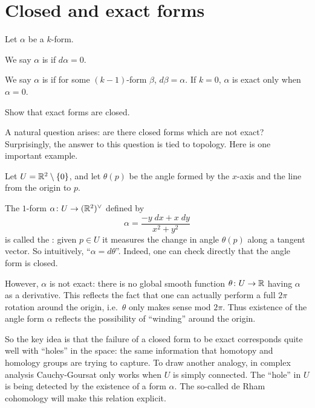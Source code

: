 \section{Closed and exact forms}
Let $\alpha$ be a $k$-form.
\begin{definition}
	We say $\alpha$ is  if $d\alpha = 0$.
\end{definition}
\begin{definition}
	We say $\alpha$ is  if for some $(k-1)$-form $\beta$,
	$d\beta = \alpha$.  If $k = 0$, $\alpha$ is exact only when $\alpha = 0$.
\end{definition}
\begin{ques}
	Show that exact forms are closed.
\end{ques}

A natural question arises: are there closed forms
which are not exact?
Surprisingly, the answer to this question is tied to topology.
Here is one important example.

\begin{example}
	\label{ex:angle_form}
	Let $U = \mathbb R^2 \setminus \{0\}$,
	and let $\theta(p)$ be the angle formed by the $x$-axis
	and the line from the origin to $p$.

	The $1$-form $\alpha \colon U \to (\mathbb R^2)^\vee$ defined by
	\[ \alpha = \frac{-y \; dx + x \; dy}{x^2+y^2} \]
	is called the :
	given $p \in U$ it measures the change in angle $\theta(p)$
	along a tangent vector.
	So intuitively, ``$\alpha = d\theta$''.
	Indeed, one can check directly that the angle form is closed.

	However, $\alpha$ is not exact: there is no global smooth
	function $\theta \colon U \to \mathbb R$ having $\alpha$ as a derivative.
	This reflects the fact that one can actually perform
	a full $2\pi$ rotation around the origin, i.e.\ $\theta$
	only makes sense mod $2\pi$.
	Thus existence of the angle form $\alpha$ reflects
	the possibility of ``winding'' around the origin.
\end{example}

So the key idea is that the failure of a closed form to be exact
corresponds quite well with ``holes'' in the space:
the same information that homotopy and homology groups are trying to capture.
To draw another analogy, in complex analysis Cauchy-Goursat
only works when $U$ is simply connected.
The ``hole'' in $U$ is being detected by the existence of a form $\alpha$.
The so-called de Rham cohomology will make this relation explicit.

